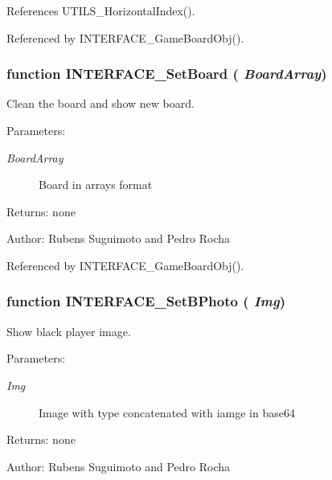 References UTILS\_\-HorizontalIndex().

Referenced by INTERFACE\_\-GameBoardObj().
\subsubsection[INTERFACE\_\-SetBoard]{\setlength{\rightskip}{0pt plus 5cm}function INTERFACE\_\-SetBoard ( {\em BoardArray})}\label{interface_2game_8js_b5dee8d500721d212ef0851fc6da651b}


Clean the board and show new board. 

\begin{Desc}
\item[Parameters:]
\begin{description}
\item[{\em BoardArray}]Board in arrays format \end{description}
\end{Desc}
\begin{Desc}
\item[Returns:]none \end{Desc}
\begin{Desc}
\item[Author:]Rubens Suguimoto and Pedro Rocha \end{Desc}


Referenced by INTERFACE\_\-GameBoardObj().
\subsubsection[INTERFACE\_\-SetBPhoto]{\setlength{\rightskip}{0pt plus 5cm}function INTERFACE\_\-SetBPhoto ( {\em Img})}\label{interface_2game_8js_201dc6b8039e6a8e075a986b72a08291}


Show black player image. 

\begin{Desc}
\item[Parameters:]
\begin{description}
\item[{\em Img}]Image with type concatenated with iamge in base64 \end{description}
\end{Desc}
\begin{Desc}
\item[Returns:]none \end{Desc}
\begin{Desc}
\item[Author:]Rubens Suguimoto and Pedro Rocha \end{Desc}


